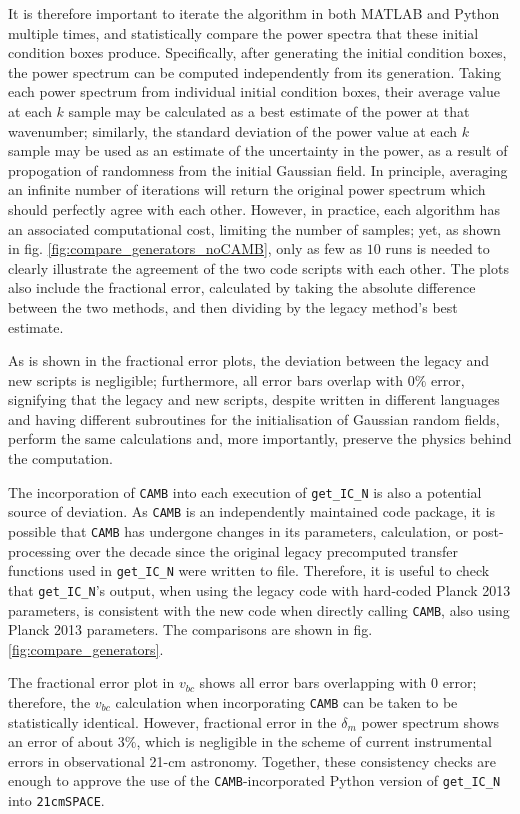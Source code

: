 \documentclass[floats,floatfix,showpacs,amssymb,prd,superscriptaddress,nofootinbib]{revtex4-2} %
\newcommand{\code}{\texttt}
\newcommand{\red}{\textcolor{red}}
\begin{document}
It is therefore important to iterate the algorithm in both MATLAB and Python multiple times, and statistically compare the power spectra that these initial condition boxes produce. Specifically, after generating the initial condition boxes, the power spectrum can be computed independently from its generation. Taking each power spectrum from individual initial condition boxes, their average value at each $k$ sample may be calculated as a best estimate of the power at that wavenumber; similarly, the standard deviation of the power value at each $k$ sample may be used as an estimate of the uncertainty in the power, as a result of propogation of randomness from the initial Gaussian field. In principle, averaging an infinite number of iterations will return the original power spectrum which should perfectly agree with each other. However, in practice, each algorithm has an associated computational cost, limiting the number of samples; yet, as shown in fig. \ref{fig:compare_generators_noCAMB}, only as few as $10$ runs is needed to clearly illustrate the agreement of the two code scripts with each other. The plots also include the fractional error, calculated by taking the absolute difference between the two methods, and then dividing by the legacy method's best estimate.

As is shown in the fractional error plots, the deviation between the legacy and new scripts is negligible; furthermore, all error bars overlap with $0 \%$ error, signifying that the legacy and new scripts, despite written in different languages and having different subroutines for the initialisation of Gaussian random fields, perform the same calculations and, more importantly, preserve the physics behind the computation.

The incorporation of \code{CAMB} into each execution of \code{get\_IC\_N} is also a potential source of deviation. As \code{CAMB} is an independently maintained code package, it is possible that \code{CAMB} has undergone changes in its parameters, calculation, or post-processing over the decade since the original legacy precomputed transfer functions used in \code{get\_IC\_N} were written to file. Therefore, it is useful to check that \code{get\_IC\_N}'s output, when using the legacy code with hard-coded Planck 2013 parameters, is consistent with the new code when directly calling \code{CAMB}, also using Planck 2013 parameters. The comparisons are shown in fig. \ref{fig:compare_generators}.

The fractional error plot in $v_{bc}$ shows all error bars overlapping with $0$ error; therefore, the $v_{bc}$ calculation when incorporating \code{CAMB} can be taken to be statistically identical. However, fractional error in the $\delta_m$ power spectrum shows an error of about $3 \%$, 
which is negligible in the scheme of current instrumental errors in observational 21-cm astronomy. Together, these consistency checks are enough to approve the use of the \code{CAMB}-incorporated Python version of \code{get\_IC\_N} into \code{21cmSPACE}.
\end{document}
